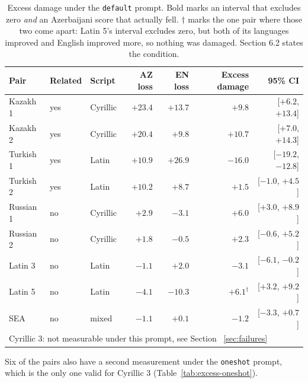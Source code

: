 \documentclass[final]{clv2025}
\begin{document}
\begin{table}[h!]
\caption{Excess damage under the \texttt{default} prompt. Bold marks an
interval that excludes zero \emph{and} an Azerbaijani score that actually fell.
$\dagger$ marks the one pair where those two come apart: Latin 5's interval
excludes zero, but both of its languages improved and English improved more, so
nothing was damaged. Section 6.2 states the condition.}
\label{tab:excess-default}
\centering
\small
\begin{tabular}{lllrrrr}
\toprule
Pair & Related & Script & AZ loss & EN loss & Excess damage & 95\% CI \\
\midrule
Kazakh 1 & yes & Cyrillic & $+23.4$ & $+13.7$ & $\mathbf{+9.8}$ & [$+6.2$, $+13.4$] \\
Kazakh 2 & yes & Cyrillic & $+20.4$ & $+9.8$ & $\mathbf{+10.7}$ & [$+7.0$, $+14.3$] \\
Turkish 1 & yes & Latin & $+10.9$ & $+26.9$ & $-16.0$ & [$-19.2$, $-12.8$] \\
Turkish 2 & yes & Latin & $+10.2$ & $+8.7$ & $+1.5$ & [$-1.0$, $+4.5$] \\
Russian 1 & no & Cyrillic & $+2.9$ & $-3.1$ & $\mathbf{+6.0}$ & [$+3.0$, $+8.9$] \\
Russian 2 & no & Cyrillic & $+1.8$ & $-0.5$ & $+2.3$ & [$-0.6$, $+5.2$] \\
Latin 3 & no & Latin & $-1.1$ & $+2.0$ & $-3.1$ & [$-6.1$, $-0.2$] \\
Latin 5 & no & Latin & $-4.1$ & $-10.3$ & $+6.1^{\dagger}$ & [$+3.2$, $+9.2$] \\
SEA & no & mixed & $-1.1$ & $+0.1$ & $-1.2$ & [$-3.3$, $+0.7$] \\
\midrule
\multicolumn{7}{l}{Cyrillic 3: not measurable under this prompt, see Section~
\ref{sec:failures}} \\
\bottomrule
\end{tabular}
\end{table}

Six of the pairs also have a second measurement under the \texttt{oneshot}
prompt, which is the only one valid for Cyrillic 3
(Table~\ref{tab:excess-oneshot}).
\end{document}
